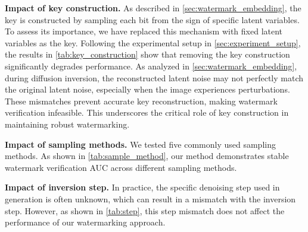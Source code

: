\noindent
\textbf{Impact of key construction.}
As described in \cref{sec:watermark_embedding}, the key is constructed by sampling each bit from the sign of specific latent variables. To assess its importance, we have replaced this mechanism with fixed latent variables as the key.  
Following the experimental setup in \cref{sec:experiment_setup}, the results in \cref{tab:key_construction} show that removing the key construction significantly degrades performance. 
As analyzed in \cref{sec:watermark_embedding}, during diffusion inversion, the reconstructed latent noise may not perfectly match the original latent noise, especially when the image experiences perturbations. These mismatches prevent accurate key reconstruction, making watermark verification infeasible. This underscores the critical role of key construction in maintaining robust watermarking.



\noindent
\textbf{Impact of sampling methods.}
We tested five commonly used sampling methods. As shown in \cref{tab:sample_method}, our method demonstrates stable watermark verification AUC across different sampling methods.


\noindent
\textbf{Impact of inversion step.}
In practice, the specific denoising step used in generation is often unknown, which can result in a mismatch with the inversion step. However, as shown in \cref{tab:step}, this step mismatch does not affect the performance of our watermarking approach.
